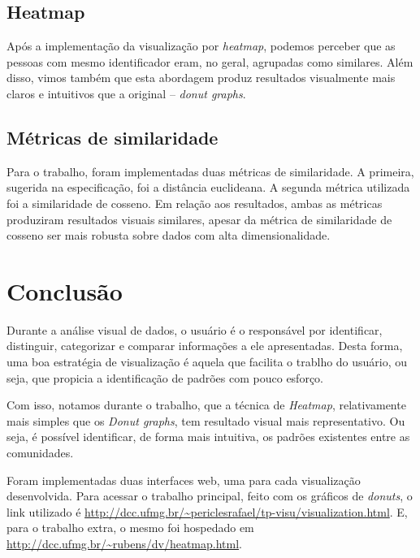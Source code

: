\documentclass[12pt]{article}
\begin{document}
\subsection{Heatmap}
Após a implementação da visualização por {\it heatmap}, podemos perceber
que as pessoas com mesmo identificador eram, no geral, agrupadas
como similares. Além disso, vimos também que esta abordagem produz resultados
visualmente mais claros e intuitivos que a original -- {\it donut graphs}.

\subsection{Métricas de similaridade}
Para o trabalho, foram implementadas duas métricas de similaridade.
A primeira, sugerida na especificação, foi a distância euclideana.
A segunda métrica utilizada foi a similaridade de cosseno.
Em relação aos resultados, ambas as métricas produziram resultados visuais
similares, apesar da métrica de similaridade de cosseno ser mais robusta
sobre dados com alta dimensionalidade.

\section{Conclusão}
Durante a análise visual de dados, o usuário é o responsável
por identificar, distinguir, categorizar e comparar informações a ele
apresentadas. Desta forma, uma boa estratégia de visualização é aquela
que facilita o trablho do usuário, ou seja, que propicia a identificação
de padrões com pouco esforço.

Com isso, notamos durante o trabalho, que a técnica de {\it Heatmap},
relativamente mais simples que os {\it Donut graphs}, tem resultado visual
mais representativo. Ou seja, é possível identificar, de forma mais intuitiva,
os padrões existentes entre as comunidades.

Foram implementadas duas interfaces web, uma para cada visualização
desenvolvida. Para acessar o trabalho principal, feito com os gráficos
de {\it donuts}, o link utilizado é 
\url{http://dcc.ufmg.br/~periclesrafael/tp-visu/visualization.html}.
E, para o trabalho extra, o mesmo foi hospedado em
\url{http://dcc.ufmg.br/~rubens/dv/heatmap.html}.
\end{document}
